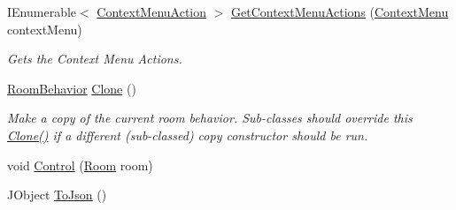 \begin{DoxyCompactItemize}
I\+Enumerable$<$ \hyperlink{class_context_menu_action}{Context\+Menu\+Action} $>$ \hyperlink{class_project_porcupine_1_1_rooms_1_1_room_behavior_a21b7f3134d1a74f70aa7a1d0f8ee9c23}{Get\+Context\+Menu\+Actions} (\hyperlink{class_context_menu}{Context\+Menu} context\+Menu)
\begin{DoxyCompactList}\small\item\em Gets the Context Menu Actions. \end{DoxyCompactList}\item 
\hyperlink{class_project_porcupine_1_1_rooms_1_1_room_behavior}{Room\+Behavior} \hyperlink{class_project_porcupine_1_1_rooms_1_1_room_behavior_a474e120ab2239b9ede3fe4ededf9f818}{Clone} ()
\begin{DoxyCompactList}\small\item\em Make a copy of the current room behavior. Sub-\/classes should override this \hyperlink{class_project_porcupine_1_1_rooms_1_1_room_behavior_a474e120ab2239b9ede3fe4ededf9f818}{Clone()} if a different (sub-\/classed) copy constructor should be run. \end{DoxyCompactList}\item 
void \hyperlink{class_project_porcupine_1_1_rooms_1_1_room_behavior_ae89500a977f0bf215f4179f7e7921b1b}{Control} (\hyperlink{class_project_porcupine_1_1_rooms_1_1_room}{Room} room)
\item 
J\+Object \hyperlink{class_project_porcupine_1_1_rooms_1_1_room_behavior_a0f4f21306dc09b45b022e86d5879196f}{To\+Json} ()
\end{DoxyCompactItemize}
